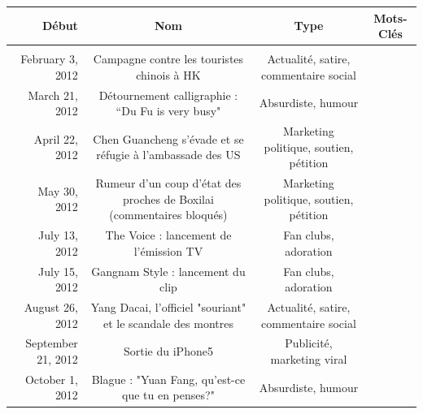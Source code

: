 \begin{landscape}
\begin{table}

    \begin{tabulary}{\linewidth}{ r| C C C}

        \textbf{Début} & 
        \textbf{Nom} &  
        \textbf{Type} &  
        \textbf{Mots-Clés} \\

        \hline \\[-1.2ex]
        February 3, 2012 & 
        Campagne contre les touristes chinois à HK & 
        Actualité, satire, commentaire social &
         \\

        March 21, 2012 &
        Détournement calligraphie : “Du Fu is very busy" &
        Absurdiste, humour &
         \\

        April 22, 2012 &
        Chen Guancheng s'évade et se réfugie à l'ambassade des US &
        Marketing politique, soutien, pétition &
         \\

        May 30, 2012 & 
        Rumeur d'un coup d'état des proches de Boxilai (commentaires bloqués) &
        Marketing politique, soutien, pétition & 
         \\

        July 13, 2012 &  
        The Voice : lancement de l'émission TV &
         Fan clubs, adoration & 
         \\

        July 15, 2012 &  
        Gangnam Style : lancement du clip &  
        Fan clubs, adoration  &  
         \\

        August 26, 2012 &
        Yang Dacai, l'officiel "souriant" et le scandale des montres &   
        Actualité, satire, commentaire social &  
         \\

        September 21, 2012 & 
        Sortie du iPhone5   &
        Publicité, marketing viral & 
         \\

        October 1, 2012 & 
        Blague : "Yuan Fang, qu'est-ce que tu en penses?"  & 
        Absurdiste, humour & 
         \\


\end{tabulary}
\end{table}
\end{landscape}
